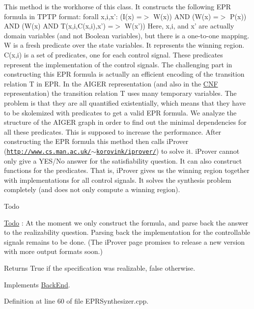 This method is the workhorse of this class. It constructs the following E\-P\-R formula in T\-P\-T\-P format\-: forall x,i,x'\-: (I(x) =$>$ W(x)) A\-N\-D (W(x) =$>$ P(x)) A\-N\-D (W(x) A\-N\-D T(x,i,C(x,i),x') =$>$ W(x')) Here, x,i, and x' are actually domain variables (and not Boolean variables), but there is a one-\/to-\/one mapping. W is a fresh predicate over the state variables. It represents the winning region. C(x,i) is a set of predicates, one for each control signal. These predicates represent the implementation of the control signals. The challenging part in constructing this E\-P\-R formula is actually an efficient encoding of the transition relation T in E\-P\-R. In the A\-I\-G\-E\-R representation (and also in the \hyperlink{classCNF}{C\-N\-F} representation) the transition relation T uses many temporary variables. The problem is that they are all quantified existentially, which means that they have to be skolemized with predicates to get a valid E\-P\-R formula. We analyze the structure of the A\-I\-G\-E\-R graph in order to find out the minimal dependencies for all these predicates. This is supposed to increase the performance. After constructing the E\-P\-R formula this method then calls i\-Prover (\href{http://www.cs.man.ac.uk/~korovink/iprover/}{\tt http\-://www.\-cs.\-man.\-ac.\-uk/$\sim$korovink/iprover/}) to solve it. i\-Prover cannot only give a Y\-E\-S/\-No answer for the satisfiability question. It can also construct functions for the predicates. That is, i\-Prover gives us the winning region together with implementations for all control signals. It solves the synthesis problem completely (and does not only compute a winning region).

\begin{DoxyRefDesc}{Todo}
\item[\hyperlink{todo__todo000003}{Todo}]\-: At the moment we only construct the formula, and parse back the answer to the realizability question. Parsing back the implementation for the controllable signals remains to be done. (The i\-Prover page promises to release a new version with more output formats soon.) \end{DoxyRefDesc}
\begin{DoxyReturn}{Returns}
True if the specification was realizable, false otherwise. 
\end{DoxyReturn}


Implements \hyperlink{classBackEnd_a099e717dc71e9cc2d838b1ca86340590}{Back\-End}.



Definition at line 60 of file E\-P\-R\-Synthesizer.\-cpp.



